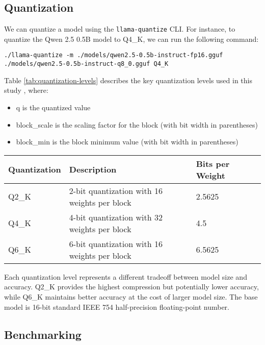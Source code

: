 \subsection{Quantization}

We can quantize a model using the \texttt{llama-quantize} CLI. For instance, to quantize the Qwen 2.5 0.5B model to Q4\_K, we can run the following command:
\begin{verbatim}
./llama-quantize -m ./models/qwen2.5-0.5b-instruct-fp16.gguf ./models/qwen2.5-0.5b-instruct-q8_0.gguf Q4_K
\end{verbatim}

Table \ref{tab:quantization-levels} describes the key quantization levels used in this study , where:
\begin{itemize}
\item q is the quantized value
\item block\_scale is the scaling factor for the block (with bit width in parentheses)
\item block\_min is the block minimum value (with bit width in parentheses)
\end{itemize}

\begin{table*}[h!]
\centering
\caption{Quantization Levels \cite{huggingface2024quantization}.}
\label{tab:quantization-levels}
\begin{tabular}{llll}
\toprule
Quantization & Description & Bits per Weight \\
\midrule
Q2\_K & 2-bit quantization with 16 weights per block & 2.5625  \\
Q4\_K & 4-bit quantization with 32 weights per block & 4.5  \\
Q6\_K & 6-bit quantization with 16 weights per block & 6.5625  \\
\bottomrule
\end{tabular}
\end{table*}

Each quantization level represents a different tradeoff between model size and accuracy. Q2\_K provides the highest compression but potentially lower accuracy, while Q6\_K maintains better accuracy at the cost of larger model size. The base model is 16-bit standard IEEE 754 half-precision floating-point number.

\subsection{Benchmarking}

